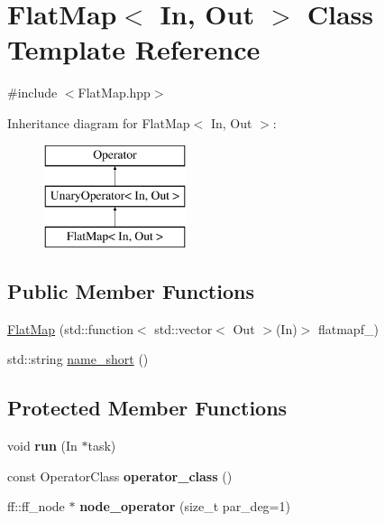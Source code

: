 \hypertarget{class_flat_map}{\section{\-Flat\-Map$<$ \-In, \-Out $>$ \-Class \-Template \-Reference}
\label{class_flat_map}
}


{\ttfamily \#include $<$\-Flat\-Map.\-hpp$>$}

\-Inheritance diagram for \-Flat\-Map$<$ \-In, \-Out $>$\-:\begin{figure}[H]
\begin{center}
\leavevmode
\includegraphics[height=3.000000cm]{class_flat_map}
\end{center}
\end{figure}
\subsection*{\-Public \-Member \-Functions}
\begin{DoxyCompactItemize}
\item 
\hyperlink{class_flat_map_a8ec8c425acf80cf2577b434b195904bd}{\-Flat\-Map} (std\-::function$<$ std\-::vector$<$ \-Out $>$(\-In)$>$ flatmapf\-\_\-)
\item 
std\-::string \hyperlink{class_flat_map_ae5ead8986dd0847b81a65c4857e856c7}{name\-\_\-short} ()
\end{DoxyCompactItemize}
\subsection*{\-Protected \-Member \-Functions}
\begin{DoxyCompactItemize}
\item 
\hypertarget{class_flat_map_ac02777613b25e9fcf563d3060a9fde26}{void {\bfseries run} (\-In $\ast$task)}\label{class_flat_map_ac02777613b25e9fcf563d3060a9fde26}

\item 
\hypertarget{class_flat_map_a448c6f98264a251bb8fb691c94bf2556}{const \-Operator\-Class {\bfseries operator\-\_\-class} ()}\label{class_flat_map_a448c6f98264a251bb8fb691c94bf2556}

\item 
\hypertarget{class_flat_map_abc46d83d6c841e3113f611ab5f9ab48f}{ff\-::ff\-\_\-node $\ast$ {\bfseries node\-\_\-operator} (size\-\_\-t par\-\_\-deg=1)}\label{class_flat_map_abc46d83d6c841e3113f611ab5f9ab48f}

\end{DoxyCompactItemize}
